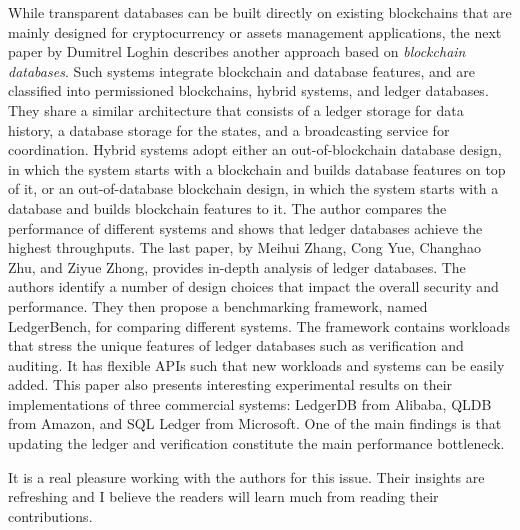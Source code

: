 \documentclass[11pt]{article}
\begin{document}
While transparent databases can be built directly on existing blockchains that are mainly designed for
cryptocurrency or assets management applications, the next paper by Dumitrel Loghin describes another approach
based on {\em blockchain databases}. Such systems integrate blockchain and database features, and are  
classified into permissioned blockchains, hybrid systems, and ledger databases. They share a similar
architecture that consists of a ledger storage for data history, a database storage for the states, and a
broadcasting service for coordination. Hybrid systems adopt either an out-of-blockchain database design, in
which the system starts with a blockchain and builds database features on top of it, or an out-of-database
blockchain design, in which the system starts with a database and builds blockchain features to it. The author
compares the performance of different systems and shows that ledger databases achieve the
highest throughputs. The last paper, by Meihui Zhang, Cong
Yue, Changhao Zhu, and Ziyue Zhong, provides in-depth analysis of ledger databases. The authors identify a
number of design choices that impact the overall security and performance. They then
propose a benchmarking framework, named LedgerBench, for comparing different systems. The framework contains
workloads that stress the unique features of ledger databases such as verification and auditing. It has
flexible APIs such that new workloads and systems can be easily added. This paper also presents interesting
experimental results on their implementations of three commercial systems: LedgerDB from Alibaba, QLDB from
Amazon, and SQL Ledger from Microsoft. One of the main findings is that updating the ledger and verification
constitute the main performance bottleneck.  

It is a real pleasure working with the authors for this issue. Their insights are refreshing and I believe
the readers will learn much from reading their contributions.  
\end{document}
